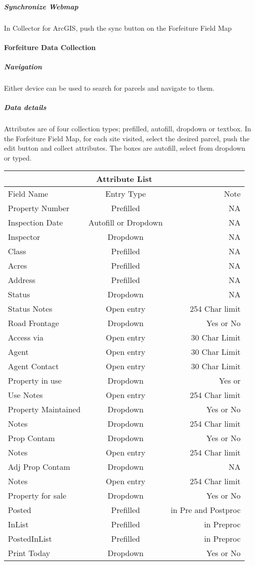\documentclass[class=article , crop=false, titlepage, twoside, multi={itemize, figure, verbatim}, float=false]{standalone}
\begin{document}
\subparagraph{Synchronize Webmap}In Collector for ArcGIS, push the sync button on the Forfeiture Field Map 

\paragraph{Forfeiture Data Collection}

\subparagraph{Navigation}Either device can be used to search for parcels and navigate to them. 

\newpage
\subparagraph*{Data details\\}
Attributes are of four collection types; prefilled, autofill, dropdown or textbox.  In the Forfeiture Field Map, for each site visited, select the desired parcel, push the edit button and collect attributes.  The boxes are autofill, select from dropdown or typed.\\ \bigskip 
\begin{tabular}{|l|c|r|}
\hline
\multicolumn{3}{|c|}{Attribute List} \\
\hline
Field Name&Entry Type&Note\\ \hline
Property Number&Prefilled&NA\\
Inspection Date&{\scriptsize Autofill or Dropdown}&NA\\
Inspector&Dropdown&NA\\
Class&Prefilled&NA\\
Acres&Prefilled&NA\\
Address&Prefilled&NA\\
Status&Dropdown&NA\\
Status Notes&Open entry&254 Char limit\\
Road Frontage&Dropdown&Yes or No\\
Access via&Open entry&30 Char Limit\\
Agent&Open entry&30 Char Limit\\
Agent Contact&Open entry&30 Char Limit\\
Property in use&Dropdown&Yes or\\
Use Notes&Open entry&254 Char limit\\
Property Maintained&Dropdown&Yes or No\\
Notes&Dropdown&254 Char limit\\
Prop Contam&Dropdown&Yes or No\\
Notes&Open entry&254 Char limit\\
Adj Prop Contam&Dropdown&NA\\
Notes&Open entry&254 Char limit\\
Property for sale&Dropdown&Yes or No\\
Posted&Prefilled&in Pre and Postproc\\
InList&Prefilled&in Preproc\\
PostedInList&Prefilled&in Preproc\\
Print Today&Dropdown&Yes or No\\ \hline
\end{tabular}
\end{document}

